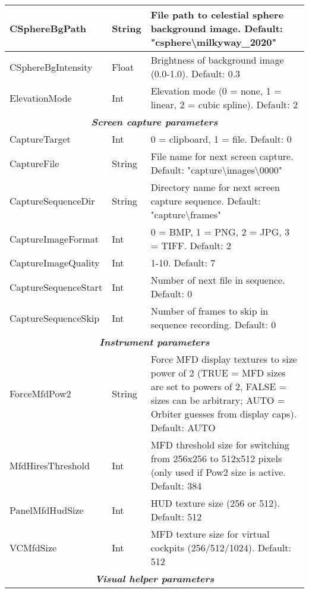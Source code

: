 \documentclass[Orbiter User Manual.tex]{subfiles}
\begin{document}
\begin{longtable}{ |p{}|p{}|p{}| }
	\hline\rule{0pt}{2ex}
	CSphereBgPath & String & File path to celestial sphere background image. Default: "csphere\textbackslash milkyway\_2020"\\
	\hline\rule{0pt}{2ex}
	CSphereBgIntensity & Float & Brightness of background image (0.0-1.0). Default: 0.3\\
	\hline\rule{0pt}{2ex}
	ElevationMode & Int & Elevation mode (0 = none, 1 = linear, 2 = cubic spline). Default: 2\\
	\hline
	\multicolumn{3}{|c|}{\rule{0pt}{2ex}\textbf{\textit{Screen capture parameters}}}\\
	\hline\rule{0pt}{2ex}
	CaptureTarget & Int & 0 = clipboard, 1 = file. Default: 0\\
	\hline\rule{0pt}{2ex}
	CaptureFile & String & File name for next screen capture. Default: "capture\textbackslash images\textbackslash 0000"\\
	\hline\rule{0pt}{2ex}
	CaptureSequenceDir & String & Directory name for next screen capture sequence. Default: "capture\textbackslash frames"\\
	\hline\rule{0pt}{2ex}
	CaptureImageFormat & Int & 0 = BMP, 1 = PNG, 2 = JPG, 3 = TIFF. Default: 2\\
	\hline\rule{0pt}{2ex}
	CaptureImageQuality & Int & 1-10. Default: 7\\
	\hline\rule{0pt}{2ex}
	CaptureSequenceStart & Int & Number of next file in sequence. Default: 0\\
	\hline\rule{0pt}{2ex}
	CaptureSequenceSkip & Int & Number of frames to skip in sequence recording. Default: 0\\
	\hline
	\multicolumn{3}{|c|}{\rule{0pt}{2ex}\textbf{\textit{Instrument parameters}}}\\
	\hline\rule{0pt}{2ex}
	ForceMfdPow2 & String & Force MFD display textures to size power of 2 (TRUE = MFD sizes are set to powers of 2, FALSE = sizes can be arbitrary; AUTO = Orbiter guesses from display caps). Default: AUTO\\
	\hline\rule{0pt}{2ex}
	MfdHiresThreshold & Int & MFD threshold size for switching from 256x256 to 512x512 pixels (only used if Pow2 size is active. Default: 384\\
	\hline\rule{0pt}{2ex}
	PanelMfdHudSize & Int & HUD texture size (256 or 512). Default: 512\\
	\hline\rule{0pt}{2ex}
	VCMfdSize & Int & MFD texture size for virtual cockpits (256/512/1024). Default: 512\\
	\hline
	\multicolumn{3}{|c|}{\rule{0pt}{2ex}\textbf{\textit{Visual helper parameters}}}\\

\end{longtable}
\end{document}
